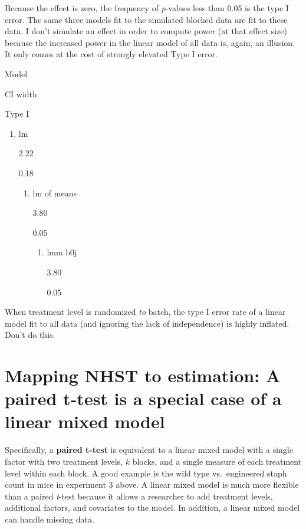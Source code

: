 \documentclass[]{book}
\providecommand{\tightlist}{%
  \setlength{\itemsep}{0pt}\setlength{\parskip}{0pt}}
\begin{document}
Because the effect is zero, the frequency of \emph{p}-values less than 0.05 is the type I error. The same three models fit to the simulated blocked data are fit to these data. I don't simulate an effect in order to compute power (at that effect size) because the increased power in the linear model of all data is, again, an illusion. It only comes at the cost of strongly elevated Type I error.

Model

CI width

Type I

\begin{enumerate}
\def\labelenumi{\arabic{enumi}.}
\tightlist
\item
  lm

  2.22

  0.18

  \begin{enumerate}
  \def\labelenumii{\arabic{enumii}.}
  \setcounter{enumii}{1}
  \tightlist
  \item
    lm of means

    3.80

    0.05

    \begin{enumerate}
    \def\labelenumiii{\arabic{enumiii}.}
    \setcounter{enumiii}{2}
    \tightlist
    \item
      lmm b0j

      3.80

      0.05
    \end{enumerate}
  \end{enumerate}
\end{enumerate}

When treatment level is randomized \emph{to} batch, the type I error rate of a linear model fit to all data (and ignoring the lack of independence) is highly inflated. Don't do this.

\hypertarget{mapping-nhst-to-estimation-a-paired-t-test-is-a-special-case-of-a-linear-mixed-model}{%
\section{Mapping NHST to estimation: A paired t-test is a special case of a linear mixed model}\label{mapping-nhst-to-estimation-a-paired-t-test-is-a-special-case-of-a-linear-mixed-model}}

Specifically, a \textbf{paired t-test} is equivalent to a linear mixed model with a single factor with two treatment levels, \(k\) blocks, and a single measure of each treatment level within each block. A good example is the wild type vs.~engineered staph count in mice in experiment 3 above. A linear mixed model is much more flexible than a paired \emph{t}-test because it allows a researcher to add treatment levels, additional factors, and covariates to the model. In addition, a linear mixed model can handle missing data.
\end{document}
